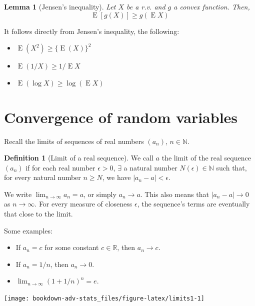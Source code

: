 \documentclass[
]{book}
\providecommand{\tightlist}{%
  \setlength{\itemsep}{0pt}\setlength{\parskip}{0pt}}
\DeclareMathOperator{\E}{E}
\newcommand{\bbR}{\mathbb{R}}
\newcommand{\bbN}{\mathbb{N}}
\newtheorem{lemma}{Lemma}[chapter]
\theoremstyle{definition}
\newtheorem{definition}{Definition}[chapter]
\theoremstyle{definition}
\theoremstyle{definition}
\theoremstyle{definition}
\theoremstyle{remark}
\begin{document}
\begin{lemma}[Jensen's inequality]
Let \(X\) be a r.v. and \(g\) a convex function. Then, \[\E\left[g(X) \right] \geq g\left(\E X \right)\]
\end{lemma}

It follows directly from Jensen's inequality, the following:

\begin{itemize}
\tightlist
\item
  \(\E(X^2) \geq \{\E(X)\}^2\)
\item
  \(\E(1/X) \geq 1 / \E X\)
\item
  \(\E(\log X) \geq \log (\E X)\)
\end{itemize}

\hypertarget{convergence-of-random-variables}{%
\section{Convergence of random variables}\label{convergence-of-random-variables}}

Recall the limits of sequences of real numbers \((a_n)\), \(n\in\bbN\).

\begin{definition}[Limit of a real sequence]
We call \(a\) the limit of the real sequence \((a_n)\) if for each real
number \(\epsilon>0\), \(\exists\) a natural number \(N(\epsilon)\in\bbN\) such that, for
every natural number \(n\geq N\), we have \(|a_n-a| < \epsilon\).
\end{definition}

We write \(\lim_{n\to\infty} a_n = a\), or simply \(a_n \to a\). This also
means that \(|a_n-a| \to 0\) as \(n\to\infty\). For every measure of
closeness \(\epsilon\), the sequence's terms are eventually that close to
the limit.

Some examples:

\begin{itemize}
\tightlist
\item
  If \(a_n=c\) for some constant \(c\in\bbR\), then \(a_n\to c\).
\item
  If \(a_n=1/n\), then \(a_n\to 0\).
\item
  \(\lim_{n\to\infty}(1+1/n)^n = e\).
\end{itemize}

\begin{center}\texttt{[image: bookdown-adv-stats\_files/figure-latex/limits1-1]} \end{center}
\end{document}
